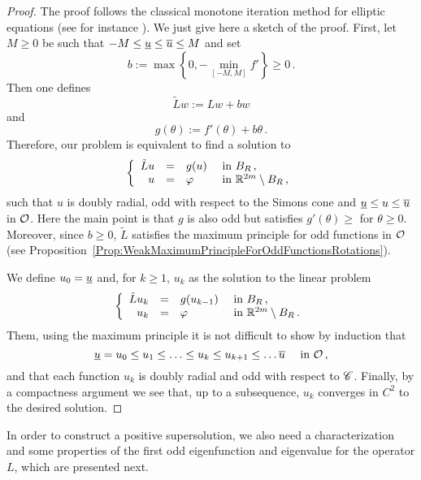 \begin{proof}
	The proof follows the classical monotone iteration method for elliptic equations (see for instance \cite{Evans}). We just give here a sketch of the proof. 
	First, let $M \geq 0$ be such that $-M \leq \underline{u} \leq \overline{u} \leq M$ and set
	$$
	b := \max \left \{{0, - \min_{[-M,M]}f'}\right \}\geq 0\,.
	$$
	Then one defines 
	$$
	\tilde{L}w := Lw + b w
	$$
	and
	$$
	g(\theta) := f'(\theta) + b \theta\,.
	$$
	Therefore, our problem is equivalent to find a solution to
	$$
	\left\{\begin{array}{rcll}
	\tilde{L}u & = & g(u) & \textrm{ in } B_R\,, \\
	u &=& \varphi &  \textrm{ in } \mathbb{R}^{2m} \setminus B_R\,, 
	\end{array} \right.
	$$
	such that $u$ is doubly radial, odd with respect to the Simons cone and  $\underline{u} \leq u \leq \overline{u}$ in $\mathcal{O}$. Here the main point is that $g$ is also odd but satisfies $g'(\theta) \geq $ for $\theta \geq 0$. Moreover, since $b \geq 0$, $\tilde{L}$ satisfies the maximum principle for odd functions in $\mathcal{O}$ (see Proposition~\ref{Prop:WeakMaximumPrincipleForOddFunctionsRotations}).
	
	We define $u_0 = \underline{u}$ and, for $k\geq 1$, $u_k$ as the solution to the linear problem
	$$
	\left\{\begin{array}{rcll}
	\tilde{L}u_k & = & g(u_{k-1}) & \textrm{ in } B_R\,, \\
	u_k &=& \varphi &  \textrm{ in } \mathbb{R}^{2m} \setminus B_R\,. 
	\end{array} \right.
	$$
	Them, using the maximum principle it is not difficult to show by induction that 
	$$
	\underline{u} = u_0 \leq u_1 \leq \ldots \leq u_k \leq u_{k+1} \leq \ldots \overline{u} \quad \text{ in }\mathcal{O}\,,
	$$
	and that each function $u_k$ is doubly radial and odd with respect to $\mathscr{C}$. Finally, by a compactness argument we see that, up to a subsequence, $u_k$ converges in $C^2$ to the desired solution.
\end{proof}

In order to construct a positive supersolution, we also need a characterization and some properties of the first odd eigenfunction and eigenvalue for the operator $L$, which are presented next.

